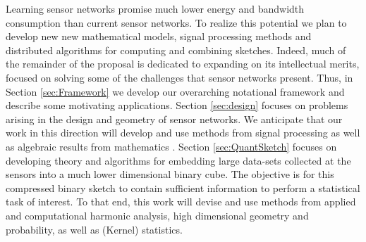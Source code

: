 Learning sensor networks promise much lower energy and bandwidth
consumption than current sensor networks. To realize this potential we
plan to develop new new mathematical models, signal processing methods
and distributed algorithms for computing and combining sketches. Indeed, much of the remainder of the proposal is dedicated to expanding on its intellectual merits, focused on solving some of the challenges that sensor networks present.
Thus, in Section \ref{sec:Framework} we develop our overarching notational framework and describe some motivating applications.  Section \ref{sec:design} focuses on problems arising in the design and geometry of sensor networks. We anticipate that our work in this direction will develop and use methods from signal processing as well as algebraic results from mathematics . 
Section \ref{sec:QuantSketch} focuses on developing theory and algorithms for embedding large data-sets collected at the sensors into a much lower dimensional binary cube. The objective is for this compressed binary sketch to contain sufficient information to perform a statistical task of interest. To that end, this work will devise and use methods from applied and computational harmonic analysis, high dimensional geometry and probability, as well as (Kernel) statistics. 

